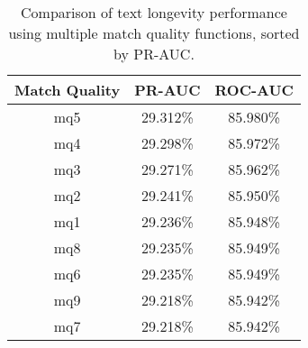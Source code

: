 \begin{table}[tbph]
\begin{center}
\begin{tabular}{|c||c|c|}
\hline
Match Quality & PR-AUC & ROC-AUC \\
\hline
\hline
mq5 & 29.312\% & 85.980\% \\
mq4 & 29.298\% & 85.972\% \\
mq3 & 29.271\% & 85.962\% \\
mq2 & 29.241\% & 85.950\% \\
mq1 & 29.236\% & 85.948\% \\
mq8 & 29.235\% & 85.949\% \\
mq6 & 29.235\% & 85.949\% \\
mq9 & 29.218\% & 85.942\% \\
mq7 & 29.218\% & 85.942\% \\
\hline
\end{tabular}
\end{center}
\caption[Performance of text longevity when varying match quality]{%
    Comparison of text longevity performance using
    multiple match quality functions, sorted by PR-AUC.}
\label{tab:textshoutA}
\end{table}
